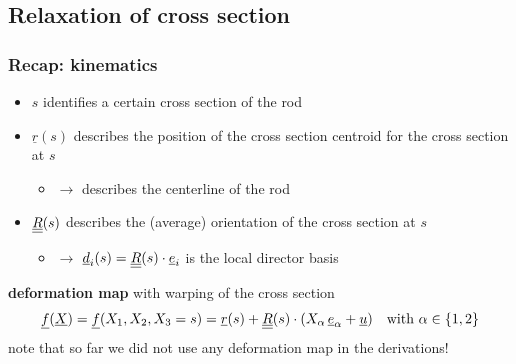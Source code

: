 \subsection{Relaxation of cross section}

\begin{frame}
  \frametitle{Recap: kinematics}

  \begin{itemize}
    \item $s$ identifies a certain cross section of the rod
    \item $\underline{r}(s)$ describes the position of the cross section centroid for the cross section at $s$
      \begin{itemize}
        \item $\rightarrow$ describes the centerline of the rod
      \end{itemize}
    \item $\underline{\underline{R}}(s)$ describes the (average) orientation of the cross section at $s$
      \begin{itemize}
        \item $\rightarrow$ $\underline{d}_i(s) = \underline{\underline{R}}(s) \cdot \underline{e}_i$ is the local director basis
      \end{itemize}
  \end{itemize}
  
  \vspace{0.6em}
  \textbf{deformation map} with warping of the cross section
  \begin{displaymath}
    \underline{f}(\underline{X}) = \underline{f}(X_1,X_2,X_3=s) = \underline{r}(s) + \underline{\underline{R}}(s) \cdot (X_{\alpha} \, \underline{e}_{\alpha} + \underline{u}) \quad \text{with } \alpha \in \{1,2\}
  \end{displaymath}
  note that so far we did not use any deformation map in the derivations!
  

\end{frame}
